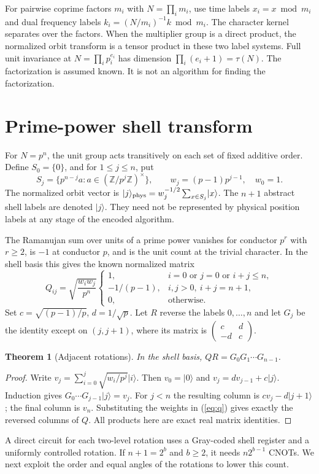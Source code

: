\documentclass[11pt]{article}
\newtheorem{theorem}{Theorem}
\newcommand{\Z}{\mathbb Z}
\newcommand{\ket}[1]{\lvert #1\rangle}
\begin{document}
For pairwise coprime factors $m_i$ with $N=\prod_i m_i$, use time labels $x_i=x\bmod m_i$ and dual frequency labels $k_i=(N/m_i)^{-1}k\bmod m_i$. The character kernel separates over the factors. When the multiplier group is a direct product, the normalized orbit transform is a tensor product in these two label systems. Full unit invariance at $N=\prod_i p_i^{e_i}$ has dimension $\prod_i(e_i+1)=\tau(N)$. The factorization is assumed known. It is not an algorithm for finding the factorization.

\section{Prime-power shell transform}
For $N=p^n$, the unit group acts transitively on each set of fixed additive order. Define $S_0=\{0\}$, and for $1\le j\le n$, put
\begin{equation}
 S_j=\{p^{n-j}a: a\in (\Z/p^j\Z)^\times\},\qquad w_j=(p-1)p^{j-1},\quad w_0=1.
\end{equation}
The normalized orbit vector is $\ket{j}_{\rm phys}=w_j^{-1/2}\sum_{x\in S_j}\ket{x}$. The $n+1$ abstract shell labels are denoted $\ket{j}$. They need not be represented by physical position labels at any stage of the encoded algorithm.

The Ramanujan sum over units of a prime power vanishes for conductor $p^r$ with $r\ge2$, is $-1$ at conductor $p$, and is the unit count at the trivial character. In the shell basis this gives the known normalized matrix
\begin{equation}\label{eq:q}
 Q_{ij}=\sqrt{\frac{w_i w_j}{p^n}}\begin{cases}
 1,& i=0\text{ or }j=0\text{ or }i+j\le n,\\
 -1/(p-1),& i,j>0,\ i+j=n+1,\\
 0,&\text{otherwise}.
 \end{cases}
\end{equation}
Set $c=\sqrt{(p-1)/p}$, $d=1/\sqrt p$. Let $R$ reverse the labels $0,\ldots,n$ and let $G_j$ be the identity except on $(j,j+1)$, where its matrix is $\left(\begin{smallmatrix}c&d\\-d&c\end{smallmatrix}\right)$.
\begin{theorem}[Adjacent rotations]\label{thm:adj}
In the shell basis, $Q R=G_0G_1\cdots G_{n-1}$.
\end{theorem}
\begin{proof}
Write $v_j=\sum_{i=0}^j\sqrt{w_i/p^j}\ket{i}$. Then $v_0=\ket{0}$ and $v_j=d v_{j-1}+c\ket{j}$. Induction gives $G_0\cdots G_{j-1}\ket{j}=v_j$. For $j<n$ the resulting column is $c v_j-d\ket{j+1}$; the final column is $v_n$. Substituting the weights in (\ref{eq:q}) gives exactly the reversed columns of $Q$. All products here are exact real matrix identities.
\end{proof}
A direct circuit for each two-level rotation uses a Gray-coded shell register and a uniformly controlled rotation. If $n+1=2^b$ and $b\ge2$, it needs $n2^{b-1}$ CNOTs. We next exploit the order and equal angles of the rotations to lower this count.
\end{document}
